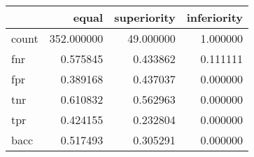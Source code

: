 \begin{tabular}{lrrr}
\toprule
{} &       equal &  superiority &  inferiority \\
\midrule
count &  352.000000 &    49.000000 &     1.000000 \\
fnr   &    0.575845 &     0.433862 &     0.111111 \\
fpr   &    0.389168 &     0.437037 &     0.000000 \\
tnr   &    0.610832 &     0.562963 &     0.000000 \\
tpr   &    0.424155 &     0.232804 &     0.000000 \\
bacc  &    0.517493 &     0.305291 &     0.000000 \\
\bottomrule
\end{tabular}
